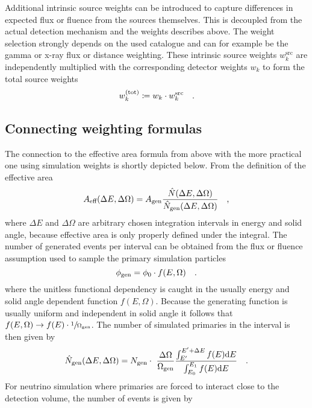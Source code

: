 Additional intrinsic source weights can be introduced to capture differences in expected flux or fluence from the sources themselves.
This is decoupled from the actual detection mechanism and the weights describes above.
The weight selection strongly depends on the used catalogue and can for example be the gamma or x-ray flux or distance weighting.
These intrinsic source weights $w_k^\text{src}$ are independently multiplied with the corresponding detector weights $w_k$ to form the total source weights
\begin{equation}
  w_k^\text{(tot)} \coloneqq w_k \cdot w_k^\text{src}
  \quad\text{.}
\end{equation}

\subsection*{Connecting weighting formulas}
The connection to the effective area formula from above with the more practical one using simulation weights is shortly depicted below.
From the definition of the effective area
\begin{equation}
  A_\text{eff}(\Delta E, \Delta \Omega) =
    A_\text{gen} \frac{\hat{N}(\Delta E, \Delta \Omega)}
                      {\hat{N}_\text{gen}(\Delta E, \Delta \Omega)}
  \quad\text{,}
\end{equation}
where $\Delta E$ and $\Delta \Omega$ are arbitrary chosen integration intervals in energy and solid angle, because effective area is only properly defined under the integral.
The number of generated events per interval can be obtained from the flux or fluence assumption used to sample the primary simulation particles
\begin{equation}
  \phi_\text{gen} = \phi_0 \cdot f(E, \Omega)
  \quad\text{.}
\end{equation}
where the unitless functional dependency is caught in the usually energy and solid angle dependent function $f(E, \Omega)$.
Because the generating function is usually uniform and independent in solid angle it follows that $f(E, \Omega) \rightarrow f(E)\cdot \sfrac{1}{\Omega_\text{gen}}$.
The number of simulated primaries in the interval is then given by
\begin{equation}
  \hat{N}_\text{gen}(\Delta E, \Delta\Omega) =
    N_\text{gen} \cdot \frac{\Delta\Omega}{\Omega_\text{gen}}
    \frac{\int_{E'}^{E'+\Delta E} f(E) \d{E}}
         {\int_{E_0}^{E_1} f(E) \d{E}}
  \mperiod
\end{equation}
For neutrino simulation where primaries are forced to interact close to the detection volume, the number of events is given by
